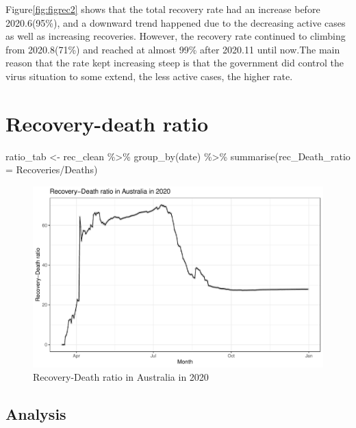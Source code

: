 \documentclass[11pt,a4paper,]{article}
\newenvironment{Shaded}{\begin{snugshade}}{\end{snugshade}}
\newcommand{\AttributeTok}[1]{\textcolor[rgb]{0.77,0.63,0.00}{#1}}
\newcommand{\FunctionTok}[1]{\textcolor[rgb]{0.00,0.00,0.00}{#1}}
\newcommand{\NormalTok}[1]{#1}
\newcommand{\OtherTok}[1]{\textcolor[rgb]{0.56,0.35,0.01}{#1}}
\newcommand{\SpecialCharTok}[1]{\textcolor[rgb]{0.00,0.00,0.00}{#1}}
\begin{document}
Figure\ref{fig:figrec2} shows that the total recovery rate had an increase before 2020.6(95\%), and a downward trend happened due to the decreasing active cases as well as increasing recoveries. However, the recovery rate continued to climbing from 2020.8(71\%) and reached at almost 99\% after 2020.11 until now.The main reason that the rate kept increasing steep is that the government did control the virus situation to some extend, the less active cases, the higher rate.

\hypertarget{recovery-death-ratio}{%
\section{Recovery-death ratio}\label{recovery-death-ratio}}

\begin{Shaded}
\begin{Highlighting}[]
\NormalTok{ratio\_tab }\OtherTok{\textless{}{-}}\NormalTok{ rec\_clean }\SpecialCharTok{\%\textgreater{}\%} 
  \FunctionTok{group\_by}\NormalTok{(date) }\SpecialCharTok{\%\textgreater{}\%} 
  \FunctionTok{summarise}\NormalTok{(}\AttributeTok{rec\_Death\_ratio =}\NormalTok{ Recoveries}\SpecialCharTok{/}\NormalTok{Deaths)}
\end{Highlighting}
\end{Shaded}

\begin{figure}
\centering
\includegraphics{report_files/figure-latex/figrec3-1.pdf}
\caption{\label{fig:figrec3}Recovery-Death ratio in Australia in 2020}
\end{figure}

\hypertarget{analysis-3}{%
\subsection{Analysis}\label{analysis-3}}
\end{document}

